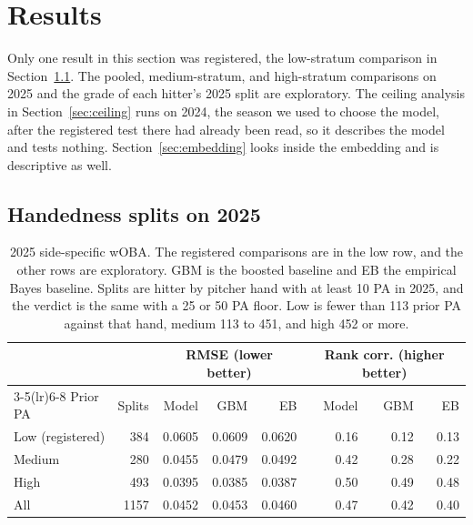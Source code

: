 \documentclass[11pt,letterpaper]{article}
\begin{document}
\section{Results}
\label{sec:results}

Only one result in this section was registered, the low-stratum comparison in Section~\ref{sec:test}. The pooled, medium-stratum, and high-stratum comparisons on 2025 and the grade of each hitter's 2025 split are exploratory. The ceiling analysis in Section~\ref{sec:ceiling} runs on 2024, the season we used to choose the model, after the registered test there had already been read, so it describes the model and tests nothing. Section~\ref{sec:embedding} looks inside the embedding and is descriptive as well.

\subsection{Handedness splits on 2025}
\label{sec:test}

\begin{table}[t]
\centering\small
\begin{tabular}{lrrrrrrr}
\toprule
 & & \multicolumn{3}{c}{RMSE (lower better)} & \multicolumn{3}{c}{Rank corr. (higher better)} \\
\cmidrule(lr){3-5}\cmidrule(lr){6-8}
Prior PA & Splits & Model & GBM & EB & Model & GBM & EB \\
\midrule
Low (registered) & 384 & 0.0605 & 0.0609 & 0.0620 & 0.16 & 0.12 & 0.13 \\
Medium & 280 & 0.0455 & 0.0479 & 0.0492 & 0.42 & 0.28 & 0.22 \\
High & 493 & 0.0395 & 0.0385 & 0.0387 & 0.50 & 0.49 & 0.48 \\
All & 1157 & 0.0452 & 0.0453 & 0.0460 & 0.47 & 0.42 & 0.40 \\\bottomrule
\end{tabular}
\caption{2025 side-specific wOBA. The registered comparisons are in the low row, and the other rows are exploratory. GBM is the boosted baseline and EB the empirical Bayes baseline. Splits are hitter by pitcher hand with at least 10 PA in 2025, and the verdict is the same with a 25 or 50 PA floor. Low is fewer than 113 prior PA against that hand, medium 113 to 451, and high 452 or more.}
\label{tab:test}
\end{table}
\end{document}

